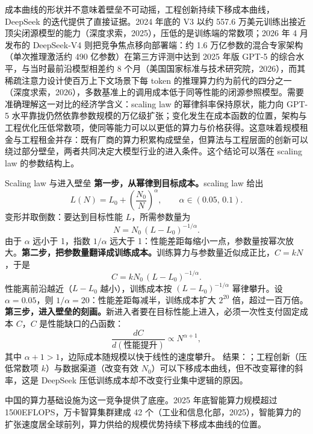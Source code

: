 成本曲线的形状并不意味着壁垒不可动摇，工程创新持续下移成本曲线，DeepSeek 的迭代提供了直接证据。2024 年底的 V3 以约 557.6 万美元训练出接近顶尖闭源模型的能力（深度求索，2025），压低的是训练端的常数项；2026 年 4 月发布的 DeepSeek-V4 则把竞争焦点移向部署端：约 1.6 万亿参数的混合专家架构（单次推理激活约 490 亿参数）在第三方评测中达到 2025 年版 GPT-5 的综合水平，与当时最前沿模型相差约 8 个月（美国国家标准与技术研究院，2026），而其稀疏注意力设计使百万上下文场景下每 token 的推理算力约为前代的四分之一（深度求索，2026），多数基准上的调用成本低于同等性能的闭源参照模型。需要准确理解这一对比的经济学含义：scaling law 的幂律斜率保持原状，能力向 GPT-5 水平靠拢仍然依靠参数规模的万亿级扩张；变化发生在成本函数的位置，架构与工程优化压低常数项，使同等能力可以以更低的算力与价格获得。这意味着规模租金与工程租金并存：既有厂商的算力积累构成壁垒，但算法与工程层面的创新可以绕过部分壁垒，两者共同决定大模型行业的进入条件。这个结论可以落在 scaling law 的参数结构上。

\begin{derivation}{Scaling law 与进入壁垒}{}
\textbf{第一步，从幂律到目标成本。}scaling law 给出
\[
L(N) = L_0 + \left(\frac{N_0}{N}\right)^{\alpha}, \qquad \alpha \in (0.05,\,0.1).
\]
变形并取倒数：要达到目标性能 $L$，所需参数量为
\[
N = N_0\,(L - L_0)^{-1/\alpha}.
\]
由于 $\alpha$ 远小于 1，指数 $1/\alpha$ 远大于 1：性能差距每缩小一点，参数量按幂次放大。\textbf{第二步，把参数量翻译成训练成本。}训练算力与参数量近似成正比，$C = kN$，于是
\[
C = k N_0\,(L - L_0)^{-1/\alpha}.
\]
性能离前沿越近（$L - L_0$ 越小），训练成本按 $(L-L_0)^{-1/\alpha}$ 幂律攀升。设 $\alpha = 0.05$，则 $1/\alpha = 20$：性能差距每减半，训练成本扩大 $2^{20}$ 倍，超过一百万倍。\textbf{第三步，进入壁垒的刻画。}新进入者要在目标性能上进入，必须一次性支付固定成本 $C$，$C$ 是性能缺口的凸函数：
\[
\frac{dC}{d(\text{性能提升})} \propto N^{\alpha+1},
\]
其中 $\alpha + 1 > 1$，边际成本随规模以快于线性的速度攀升。
结果：；工程创新（压低常数项 $k$）与数据渠道（改变有效 $N_0$）可以下移成本曲线，但不改变幂律的斜率，这是 DeepSeek 压低训练成本却不改变行业集中逻辑的原因。
\end{derivation}

中国的算力基础设施为这一竞争提供了底座。2025 年底智能算力规模超过 1500\linebreak EFLOPS，万卡智算集群建成 42 个（工业和信息化部，2025），智能算力的扩张速度居全球前列，算力供给的规模优势持续下移成本曲线的位置。

